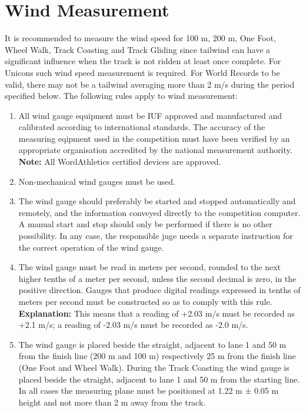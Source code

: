 \section{Wind Measurement}

	It is recommended to measure the wind speed for 100 m, 200 m, One Foot, Wheel Walk, Track Coasting and 
  Track Gliding since tailwind can have a significant influence when the track is not 
  ridden at least once complete.
	For Unicons such wind speed measurement is required.
	For World Records to be valid, there may not be a tailwind averaging more than 2 m/s during the period 
  specified below.
	The following rules apply to wind measurement:

\begin{enumerate}[leftmargin=1.5em,labelsep=*]
	\item All wind gauge equipment must be IUF approved and manufactured and calibrated according to 
  international standards.
	The accuracy of the measuring eqipment used in the competition must have been verified by an 
  appropriate organisation accredited by the national measurement authority.\\
	\textbf{Note:} All WordAthletics certified devices are approved.
	
	\item Non-mechanical wind gauges must be used.
	
	\item The wind gauge should preferably be started and stopped automatically and remotely, 
  and the information conveyed directly to the competition computer.
	A manual start and stop should only be performed if there is no other possibility.
	In any case, the responsible juge needs a separate instruction for the correct operation of the wind gauge.
	
	\item The wind gauge must be read in meters per second, rounded to the next higher tenths of a meter 
  per second, unless the second decimal is zero, in the positive direction.
	Gauges that produce digital readings expressed in tenths of meters per second must be constructed so as 
  to comply with this rule.\\	
	\textbf{Explanation:} This means that a reading of +2.03 m/s must be recorded as +2.1 m/s; a reading of 
  -2.03 m/s must be recorded as -2.0 m/s.
	
	\item The wind gauge is placed beside the straight, adjacent to lane 1 and 50 m from the 
  finish line (200 m and 100 m) respectively 25 m from the finish line (One Foot and Wheel Walk).
	During the Track Coasting the wind gauge is placed beside the straight, adjacent to lane 1 and 50 m 
  from the starting line.
	In all cases the measuring plane must be positioned at 1.22 m ± 0.05 m height 
  and not more than 2 m away from the track.
	

\end{enumerate}
